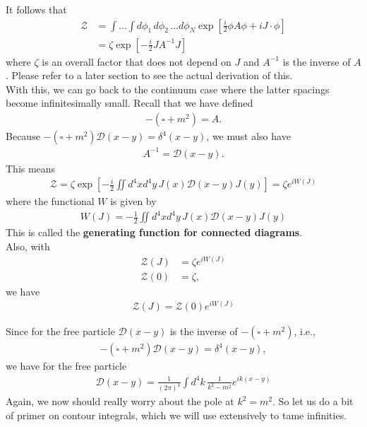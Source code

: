 \documentclass{book}
\theoremstyle{definition}
\newcommand{\f}[2]{\frac{#1}{#2}}
\newcommand{\lb}{\left[}
\newcommand{\rb}{\right]}
\newcommand{\D}{\mathcal{D}}
\newcommand{\Z}{\mathcal{Z}}
\begin{document}
It follows that
\begin{align}
\Z &= \int \dots \int d\phi_1\,d\phi_2\,\dots d\phi_N \exp\lb \f{i}{2}\phi A \phi + i J\cdot \phi\rb\\
&= \zeta \exp\lb -\f{i}{2}J A^{-1}J \rb
\end{align}
where $\zeta$ is an overall factor that does not depend on $J$ and $A^{-1}$ is the inverse of $A$. Please refer to a later section to see the actual derivation of this. \\

With this, we can go back to the continuum case where the latter spacings become infinitesimally small. Recall that we have defined
\begin{align}
-(\square + m^2) = A.
\end{align}
Because $-(\square + m^2)\D(x-y) = \delta^4(x-y)$, we must also have
\begin{align}
A^{-1} = \D(x-y).
\end{align}
This means 
\begin{align}
\boxed{\Z = \zeta \exp \lb -\f{i}{2}\iint d^4xd^4y\, J(x)\D(x-y)J(y) \rb = \zeta e^{iW(J)}}
\end{align}
where the functional $W$ is given by
\begin{align}
\boxed{W(J) = -\f{1}{2}\iint d^4xd^4y\, J(x)\D(x-y)J(y)}
\end{align}
This is called the \textbf{generating function for connected diagrams}.\\

Also, with 
\begin{align}
\Z(J) &= \zeta e^{iW(J)} \\ 
\Z(0) &= \zeta,
\end{align}
we have
\begin{align}
\boxed{\Z(J) = \Z(0) e^{iW(J)}}
\end{align}

Since for the free particle $\D(x-y)$ is the inverse of $-(\square + m^2)$, i.e.,
\begin{align}
-(\square + m^2)\D(x-y) = \delta^4 (x-y),
\end{align}
we have for the free particle
\begin{align}
\boxed{\D(x-y) = \f{1}{(2\pi)^4}\int d^4k\, \f{1}{k^2 - m^2} e^{ik(x-y)}}
\end{align}
Again, we now should really worry about the pole at $k^2 = m^2$. So let us do a bit of primer on contour integrals, which we will use extensively to tame infinities.
\end{document}

